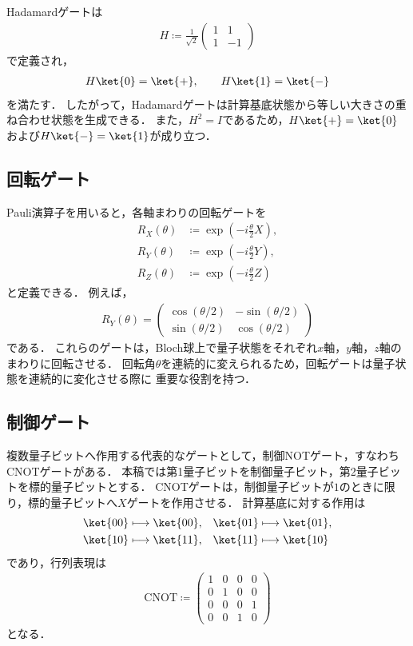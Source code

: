 Hadamardゲートは
\begin{align*}
  H
  \coloneq
  \frac{1}{\sqrt{2}}
  \begin{pmatrix}
    1 & 1 \\
    1 & -1
  \end{pmatrix}
\end{align*}
で定義され，
\begin{align*}
  H\ket{0}=\ket{+},
  \qquad
  H\ket{1}=\ket{-}
\end{align*}
を満たす．
したがって，Hadamardゲートは計算基底状態から等しい大きさの重ね合わせ状態を生成できる．
また，$H^2=I$であるため，$H\ket{+}=\ket{0}$および$H\ket{-}=\ket{1}$が成り立つ．

\subsection{回転ゲート}
\label{subsec:rotation-gates}

Pauli演算子を用いると，各軸まわりの回転ゲートを
\begin{align*}
  R_X(\theta)&\coloneq\exp\left(-i\frac{\theta}{2}X\right), \\
  R_Y(\theta)&\coloneq\exp\left(-i\frac{\theta}{2}Y\right), \\
  R_Z(\theta)&\coloneq\exp\left(-i\frac{\theta}{2}Z\right)
\end{align*}
と定義できる．
例えば，
\begin{align*}
  R_Y(\theta)
  =
  \begin{pmatrix}
    \cos(\theta/2) & -\sin(\theta/2) \\
    \sin(\theta/2) & \cos(\theta/2)
  \end{pmatrix}
\end{align*}
である．
これらのゲートは，Bloch球上で量子状態をそれぞれ$x$軸，$y$軸，$z$軸のまわりに回転させる．
回転角$\theta$を連続的に変えられるため，回転ゲートは量子状態を連続的に変化させる際に
重要な役割を持つ．

\subsection{制御ゲート}
\label{subsec:controlled-gates}

複数量子ビットへ作用する代表的なゲートとして，制御NOTゲート，すなわちCNOTゲートがある．
本稿では第1量子ビットを制御量子ビット，第2量子ビットを標的量子ビットとする．
CNOTゲートは，制御量子ビットが$1$のときに限り，標的量子ビットへ$X$ゲートを作用させる．
計算基底に対する作用は
\begin{align*}
  \ket{00}&\longmapsto\ket{00}, &
  \ket{01}&\longmapsto\ket{01}, \\
  \ket{10}&\longmapsto\ket{11}, &
  \ket{11}&\longmapsto\ket{10}
\end{align*}
であり，行列表現は
\begin{align*}
  \mathrm{CNOT}
  \coloneq
  \begin{pmatrix}
    1 & 0 & 0 & 0 \\
    0 & 1 & 0 & 0 \\
    0 & 0 & 0 & 1 \\
    0 & 0 & 1 & 0
  \end{pmatrix}
\end{align*}
となる．

